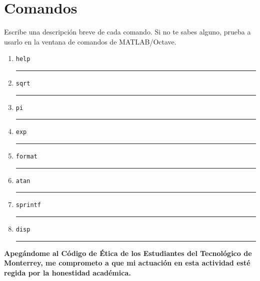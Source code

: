 \documentclass[spanish, 10pt]{article}
\newcommand{\responserule}{{\large\rule{14 cm}{0.3mm}}}
\newcommand{\matlab}[1]{\lstinline[style=Matlab-pyglike]!#1!}
\begin{document}
\section{Comandos}

Escribe una descripción breve de cada comando. Si no te sabes alguno, prueba a usarlo en la ventana de comandos de MATLAB/Octave.

\vspace{3ex}

\begin{enumerate}[label=\alph*)]
	\large
	\item \matlab{help} \\[3ex] \responserule
	\item \matlab{sqrt} \\[3ex] \responserule
	\item \matlab{pi} \\[3ex] \responserule
	\item \matlab{exp} \\[3ex] \responserule
	\item \matlab{format} \\[3ex] \responserule
	\item \matlab{atan} \\[3ex] \responserule
	\item \matlab{sprintf} \\[3ex] \responserule
	\item \matlab{disp} \\[3ex] \responserule
\end{enumerate}

\vfill

\textbf{Apegándome al Código de Ética de los Estudiantes del Tecnológico de Monterrey, me comprometo a que mi actuación en esta actividad esté regida por la honestidad académica.}
\end{document}
